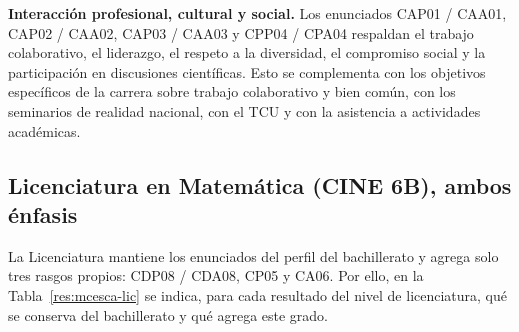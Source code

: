 \documentclass[11pt,a4paper]{article}
\begin{document}
\textbf{Interacción profesional, cultural y social.} Los enunciados CAP01 / CAA01, CAP02 / CAA02, CAP03 / CAA03 y CPP04 / CPA04 respaldan el trabajo colaborativo, el liderazgo, el respeto a la diversidad, el compromiso social y la participación en discusiones científicas. Esto se complementa con los objetivos específicos de la carrera sobre trabajo colaborativo y bien común, con los seminarios de realidad nacional, con el TCU y con la asistencia a actividades académicas.

\subsection*{Licenciatura en Matemática (CINE 6B), ambos énfasis}

La Licenciatura mantiene los enunciados del perfil del bachillerato y agrega solo tres rasgos propios: CDP08 / CDA08, CP05 y CA06. Por ello, en la Tabla~\ref{res:mcesca-lic} se indica, para cada resultado del nivel de licenciatura, qué se conserva del bachillerato y qué agrega este grado.
\end{document}

